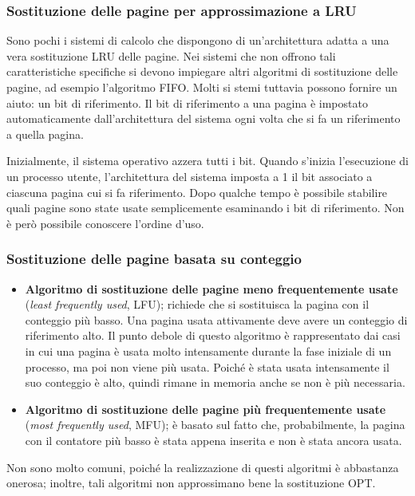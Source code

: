 \documentclass[11pt,a4paper]{article}
\begin{document}
\subsubsection{Sostituzione delle pagine per approssimazione a LRU}
Sono pochi i sistemi di calcolo che dispongono di un'architettura adatta a una vera sostitu­zione LRU delle pagine. Nei sistemi che non offrono tali caratteristiche specifiche si devono
impiegare altri algoritmi di sostituzione delle pagine, ad esempio l'algoritmo FIFO. Molti si­
stemi tuttavia possono fornire un aiuto: un bit di riferimento. Il bit di riferimento a una pagina è impostato automaticamente dall'architettura del sistema ogni volta che si fa un riferi­mento a quella pagina.

Inizialmente, il sistema operativo azzera tutti i bit. Quando s'inizia l'esecuzione di un
processo utente, l'architettura del sistema imposta a 1 il bit associato a ciascuna pagina cui si
fa riferimento. Dopo qualche tempo è possibile stabilire quali pagine sono state usate semplicemente esaminando i bit di riferimento. Non è però possibile conoscere l'ordine d'uso.

\subsubsection{Sostituzione delle pagine basata su conteggio}
\begin{itemize}
  \item \textbf{Algoritmo di sostituzione delle pagine meno frequentemente usate} (\emph{least frequently used}, LFU); richiede che si sostituisca la pagina con il conteggio più basso. Una pagina usata attivamente deve avere un conteggio di riferi­mento alto. Il punto debole di questo algoritmo è rappresentato dai casi in cui una pa­gina è usata molto intensamente durante la fase iniziale di un processo, ma poi non viene più usata. Poiché è stata usata intensamente il suo conteggio è alto, quindi rima­ne in memoria anche se non è più necessaria.
  \item \textbf{Algoritmo di sostituzione delle pagine più frequentemente usate} (\emph{most frequently used}, MFU); è basato sul fatto che, probabilmente, la pagina con il contatore più basso è stata appena inserita e non è stata ancora usata.
\end{itemize}
Non sono molto comuni, poiché la realizzazione di questi algorit­mi è abbastanza onerosa; inoltre, tali algoritmi non approssimano bene la sostituzione OPT.
\end{document}

